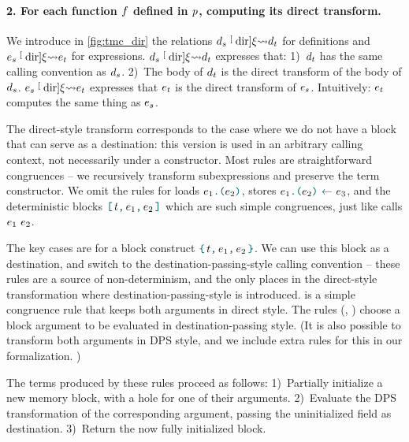 
\paragraph{2. For each function $\datalangFn$ defined in $\datalangProg$, computing its direct transform.}
We introduce in \cref{fig:tmc_dir} the relations $\datalangDef_s \tmcDir{\datalangRenaming} \datalangDef_t$ for definitions and $\datalangExpr_s \tmcDir{\datalangRenaming} \datalangExpr_t$ for expressions.
%
$\datalangDef_s \tmcDir{\datalangRenaming} \datalangDef_t$ expresses that:
1)~$\datalangDef_t$ has the same calling convention as $\datalangDef_s$.
2)~The body of $\datalangDef_t$ is the direct transform of the body of $\datalangDef_s$.
%
$\datalangExpr_s \tmcDir{\datalangRenaming} \datalangExpr_t$ expresses that $\datalangExpr_t$ is the direct transform of $\datalangExpr_s$.
Intuitively: $\datalangExpr_t$ computes the same thing as $\datalangExpr_s$.

The direct-style transform corresponds to the case where we do not have a block that can serve as a destination: this version is used in an arbitrary calling context, not necessarily under a constructor. Most rules are straightforward congruences -- we recursively transform subexpressions and preserve the term constructor. We omit the rules for loads $\datalangLoad{\datalangExpr_1}{\datalangExpr_2}$, stores $\datalangStore{\datalangExpr_1}{\datalangExpr_2}{\datalangExpr_3}$, and the deterministic blocks $\datalangBlockDet \datalangTag {\datalangExpr_1} {\datalangExpr_2}$ which are such simple congruences, just like calls $\datalangCall {\datalangExpr_1} {\datalangExpr_2}$.

The key cases are for a block construct $\datalangBlock \datalangTag {\datalangExpr_1} {\datalangExpr_2}$. We can use this block as a destination, and switch to the destination-passing-style calling convention -- these rules are a source of non-determinism, and the only places in the direct-style transformation where destination-passing-style is introduced.  is a simple congruence rule that keeps both arguments in direct style. The rules (, ) choose a block argument to be evaluated in destination-passing style. (It is also possible to transform both arguments in DPS style, and we include extra rules for this in our formalization. )

The terms produced by these rules proceed as follows:
1)~Partially initialize a new memory block, with a hole for one of their arguments.
2)~Evaluate the DPS transformation of the corresponding argument,
   passing the uninitialized field as destination.
3)~Return the now fully initialized block.

